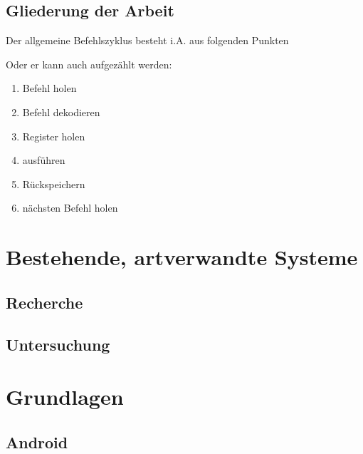\documentclass[
	10pt,			%
	a4paper,		%
	parskip=half,		%
	DIV=4,			%
	captions=nooneline,	%
	tablecaptionabove,	%
	bibliography=totoc,	%
	bibtotocnumbered,	%
	liststotocnumbered,	%
	headinclude,
	headsepline,		%
	1.6headlines,		%
	]
	{book}
\begin{document}
\section{Gliederung der Arbeit}
\blindtext
Der allgemeine Befehlszyklus besteht i.A. aus folgenden Punkten
\begin{description}[leftmargin=8em, style=nextline]
	\item[Befehl holen]{\blindtext}
	\item[Befehl dekodieren]{\blindtext}
	\item[Register holen]{\blindtext}
	\item[ausführen]{\blindtext}
	\item[Rückspeichern]{\blindtext}
	\item[nächsten Befehl holen]{\blindtext}
\end{description}

Oder er kann auch aufgezählt werden:
\begin{enumerate}
	\item Befehl holen
	\item Befehl dekodieren
	\item Register holen
	\item ausführen
	\item Rückspeichern
	\item nächsten Befehl holen
\end{enumerate}


\chapter{Bestehende, artverwandte Systeme}
\blindtext
\section{Recherche}
\section{Untersuchung}

\chapter{Grundlagen}
\blindtext

\section{Android\texttrademark}
\end{document}
